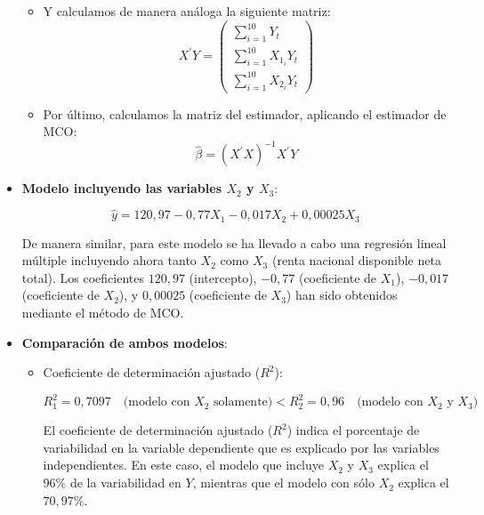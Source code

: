 \documentclass[a4paper,12pt]{article}
\begin{document}
\begin{itemize}
\begin{itemize}
    \item Y calculamos de manera análoga la siguiente matriz:
    \begin{equation*}
        X^{\prime}Y = \begin{pmatrix}
            \sum_{i=1}^{10} Y_{t} \\
            \sum_{i=1}^{10} X_{1_i}Y_{t} \\
            \sum_{i=1}^{10} X_{2_i}Y_{t}
        \end{pmatrix}
    \end{equation*}

    \item Por último, calculamos la matriz del estimador, aplicando el estimador de MCO:
    \begin{equation*}
        \hat{\beta} = (X^{\prime}X)^{-1}X^{\prime}Y
    \end{equation*}


  \end{itemize}

  \item \textbf{Modelo incluyendo las variables \(X_2\) y \(X_3\)}:
  

\[
  \hat{y} = 120,97 - 0,77X_1 - 0,017X_2 + 0,00025X_3
  \]



  De manera similar, para este modelo se ha llevado a cabo una regresión lineal múltiple incluyendo ahora tanto \(X_2\) como \(X_3\) (renta nacional disponible neta total). Los coeficientes \(120,97\) (intercepto), \(-0,77\) (coeficiente de \(X_1\)), \(-0,017\) (coeficiente de \(X_2\)), y \(0,00025\) (coeficiente de \(X_3\)) han sido obtenidos mediante el método de MCO.

  \item \textbf{Comparación de ambos modelos}:
  \begin{itemize}
    \item Coeficiente de determinación ajustado (\(R^2\)):
    

\[
    R^2_1 = 0,7097 \quad \text{(modelo con \(X_2\) solamente)} < R^2_2 = 0,96 \quad \text{(modelo con \(X_2\) y \(X_3\))}
    \]


    El coeficiente de determinación ajustado (\(R^2\)) indica el porcentaje de variabilidad en la variable dependiente que es explicado por las variables independientes. En este caso, el modelo que incluye \(X_2\) y \(X_3\) explica el \(96\%\) de la variabilidad en \(Y\), mientras que el modelo con sólo \(X_2\) explica el \(70,97\%\).


\end{itemize}
\end{itemize}
\end{document}

